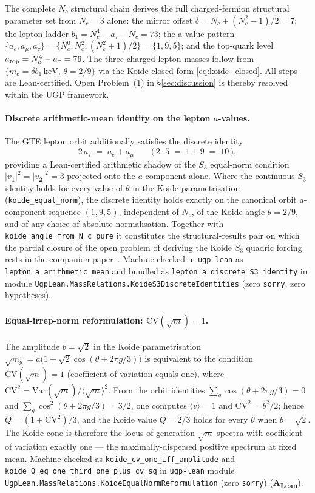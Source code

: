 \documentclass[11pt]{article}
\newcommand{\CatAL}{\textbf{A\textsubscript{Lean}}}
\theoremstyle{remark}
\begin{document}
The complete $N_c$ structural chain derives the full charged-fermion structural parameter set from $N_c = 3$ alone: the mirror offset $\delta = N_c + (N_c^2-1)/2 = 7$; the lepton ladder $b_1 = N_c^4 - a_\tau - N_c = 73$; the a-value pattern $\{a_e, a_\mu, a_\tau\} = \{N_c^0, N_c^2, (N_c^2+1)/2\} = \{1,9,5\}$; and the top-quark level $a_{\rm top} = N_c^4 - a_\tau = 76$.  The three charged-lepton masses follow from $\{m_e = \delta b_1\,\mathrm{keV},\, \theta = 2/9\}$ via the Koide closed form \eqref{eq:koide_closed}.  All steps are Lean-certified.  Open Problem~(1) in \S\ref{sec:discussion} is thereby resolved within the UGP framework.

\paragraph{Discrete arithmetic-mean identity on the lepton $a$-values.}
The GTE lepton orbit additionally satisfies the discrete identity
\[
2\, a_\tau \;=\; a_e + a_\mu \qquad \bigl(\,2 \cdot 5 \;=\; 1 + 9 \;=\; 10\,\bigr),
\]
providing a Lean-certified arithmetic shadow of the $S_3$ equal-norm condition $|v_{\mathbf{1}}|^2 = |v_{\mathbf{2}}|^2 = 3$ projected onto the $a$-component alone.  Where the continuous $S_3$ identity holds for every value of $\theta$ in the Koide parametrisation (\texttt{koide\_equal\_norm}), the discrete identity holds exactly on the canonical orbit $a$-component sequence $(1, 9, 5)$, independent of $N_c$, of the Koide angle $\theta = 2/9$, and of any choice of absolute normalisation.  Together with \texttt{koide\_angle\_from\_N\_c\_pure} it constitutes the structural-results pair on which the partial closure of the open problem of deriving the Koide $S_3$ quadric forcing rests in the companion paper~\cite{Spivack2026_SM_UGP}.  Machine-checked in \texttt{ugp-lean} as \texttt{lepton\_a\_arithmetic\_mean} and bundled as \texttt{lepton\_a\_discrete\_S3\_identity} in module \texttt{UgpLean.MassRelations.KoideS3DiscreteIdentities} (zero \texttt{sorry}, zero hypotheses).

\paragraph{Equal-irrep-norm reformulation: $\mathrm{CV}(\sqrt{m})=1$.}
The amplitude $b = \sqrt{2}$ in the Koide parametrisation $\sqrt{m_g} = a\bigl(1 + \sqrt{2}\cos(\theta + 2\pi g/3)\bigr)$ is equivalent to the condition $\mathrm{CV}(\sqrt{m}) = 1$ (coefficient of variation equals one), where $\mathrm{CV}^2 = \mathrm{Var}(\sqrt{m})/\langle\sqrt{m}\rangle^2$.  From the orbit identities $\sum_g \cos(\theta + 2\pi g/3) = 0$ and $\sum_g \cos^2(\theta + 2\pi g/3) = 3/2$, one computes $\langle v\rangle = 1$ and $\mathrm{CV}^2 = b^2/2$; hence $Q = (1 + \mathrm{CV}^2)/3$, and the Koide value $Q = 2/3$ holds for every $\theta$ when $b = \sqrt{2}$.  The Koide cone is therefore the locus of generation $\sqrt{m}$-spectra with coefficient of variation exactly one --- the maximally-dispersed positive spectrum at fixed mean.  Machine-checked as \texttt{koide\_cv\_one\_iff\_amplitude} and \texttt{koide\_Q\_eq\_one\_third\_one\_plus\_cv\_sq} in \texttt{ugp-lean} module \texttt{UgpLean.MassRelations.KoideEqualNormReformulation} (zero \texttt{sorry}) (\CatAL).
\end{document}
